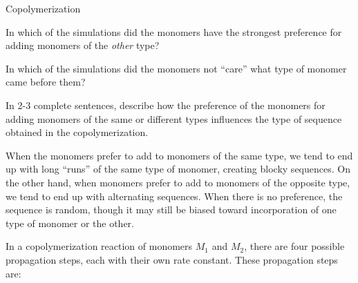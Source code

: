 \begin{activity}{Copolymerization}
\begin{ctqs}
		\begin{solution}[0.85in]\end{solution}
	
	\question In which of the simulations did the monomers have the strongest preference for adding monomers of the \emph{other} type?
	
		\begin{solution}[0.85in]\end{solution}
	
	\question In which of the simulations did the monomers not ``care'' what type of monomer came before them?
	
		\begin{solution}[0.85in]\end{solution}
	
	\question In 2-3 complete sentences, describe how the preference of the monomers for adding monomers of the same or different types influences the type of sequence obtained in the copolymerization.
	
		\begin{solution}[2in]
			When the monomers prefer to add to monomers of the same type, we tend to end up with long ``runs'' of the same type of monomer, creating blocky sequences.  On the other hand, when monomers prefer to add to monomers of the opposite type, we tend to end up with alternating sequences.  When there is no preference, the sequence is random, though it may still be biased toward incorporation of one type of monomer or the other.
		\end{solution}
\end{ctqs}

\begin{model}
\label{\labelbase:mdl:kinetics}

	In a copolymerization reaction of monomers $M_1$ and $M_2$, there are four possible propagation steps, each with their own rate constant.  These propagation steps are:
	

\end{model}
\end{activity}
